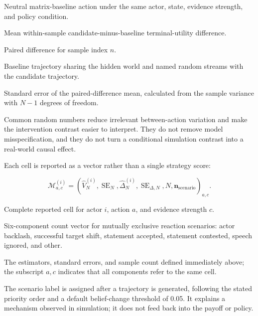 \documentclass[11pt,a4paper]{article}
\begin{document}
\begin{description}[style=nextline,leftmargin=3.4cm,labelwidth=3.0cm]
  \item[$a_0$] Neutral matrix-baseline action under the same actor, state, evidence strength, and policy condition.
  \item[$\widehat\Delta_N^{(i)}(a,c)$] Mean within-sample candidate-minus-baseline terminal-utility difference.
  \item[$d_n(a,c)$] Paired difference for sample index $n$.
  \item[$\tau_n^{a_0,c}$] Baseline trajectory sharing the hidden world and named random streams with the candidate trajectory.
  \item[$\operatorname{SE}_{\Delta,N}(a,c)$] Standard error of the paired-difference mean, calculated from the sample variance with $N-1$ degrees of freedom.
\end{description}

Common random numbers reduce irrelevant between-action variation and make the intervention contrast easier to interpret. They do not remove model misspecification, and they do not turn a conditional simulation contrast into a real-world causal effect.

Each cell is reported as a vector rather than a single strategy score:

\[
\mathcal M^{(i)}_{a,c}=
\left(\widehat V_N^{(i)},\operatorname{SE}_N,
\widehat\Delta_N^{(i)},\operatorname{SE}_{\Delta,N},
N,\mathbf n_{\mathrm{scenario}}\right)_{a,c}.
\]

\begin{description}[style=nextline,leftmargin=3.4cm,labelwidth=3.0cm]
  \item[$\mathcal M^{(i)}_{a,c}$] Complete reported cell for actor $i$, action $a$, and evidence strength $c$.
  \item[$\mathbf n_{\mathrm{scenario}}$] Six-component count vector for mutually exclusive reaction scenarios: actor backlash, successful target shift, statement accepted, statement contested, speech ignored, and other.
  \item[Other components] The estimators, standard errors, and sample count defined immediately above; the subscript $a,c$ indicates that all components refer to the same cell.
\end{description}

The scenario label is assigned after a trajectory is generated, following the stated priority order and a default belief-change threshold of 0.05. It explains a mechanism observed in simulation; it does not feed back into the payoff or policy.
\end{document}
